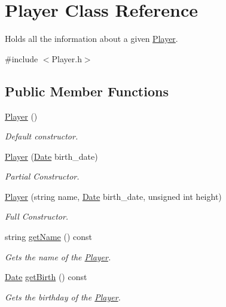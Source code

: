 \hypertarget{class_player}{}\section{Player Class Reference}
\label{class_player}


Holds all the information about a given \hyperlink{class_player}{Player}.  




{\ttfamily \#include $<$Player.\+h$>$}

\subsection*{Public Member Functions}
\begin{DoxyCompactItemize}
\item 
\hyperlink{class_player_affe0cc3cb714f6deb4e62f0c0d3f1fd8}{Player} ()
\begin{DoxyCompactList}\small\item\em Default constructor. \end{DoxyCompactList}\item 
\hyperlink{class_player_a74b724a1381ef548891d0f1a583450e0}{Player} (\hyperlink{class_date}{Date} birth\+\_\+date)
\begin{DoxyCompactList}\small\item\em Partial Constructor. \end{DoxyCompactList}\item 
\hyperlink{class_player_a61933c5f779b97caea5e13b58bbb06da}{Player} (string name, \hyperlink{class_date}{Date} birth\+\_\+date, unsigned int height)
\begin{DoxyCompactList}\small\item\em Full Constructor. \end{DoxyCompactList}\item 
string \hyperlink{class_player_a4939193fc637f75bf7a11118334dae7e}{get\+Name} () const
\begin{DoxyCompactList}\small\item\em Gets the name of the \hyperlink{class_player}{Player}. \end{DoxyCompactList}\item 
\hyperlink{class_date}{Date} \hyperlink{class_player_a40d25243f37af60da51b8020f7518700}{get\+Birth} () const
\begin{DoxyCompactList}\small\item\em Gets the birthday of the \hyperlink{class_player}{Player}. \end{DoxyCompactList}\item 

\end{DoxyCompactItemize}
